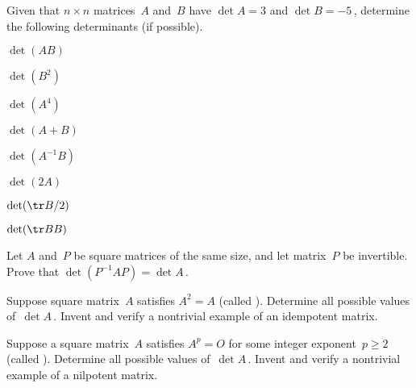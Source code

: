\begin{exercise}  
Given that \(n\times n\) matrices~\(A\) and~\(B\) have \(\det A=3\) and \(\det B=-5\)\,, determine the following determinants (if possible).
\begin{Parts}
\item \(\det(AB)\)

\item \(\det(B^2)\)

\item \(\det(A^4)\)

\item \(\det(A+B)\)

\item \(\det(A^{-1}B)\)

\item \(\det(2A)\)

\begin{OmitV1}
\item \(\det(\tr B/2)\)

\item \(\det(\tr BB)\)
\end{OmitV1}

\end{Parts}
\end{exercise}






\begin{exercise}  
Let \(A\) and~\(P\) be square matrices of the same size, and let matrix~\(P\) be invertible.  Prove that \(\det(P^{-1}AP)=\det A\)\,.
\end{exercise}





\begin{exercise}  
Suppose square matrix~\(A\) satisfies \(A^2=A\) (called ).  Determine all possible values of~\(\det A\)\,.
Invent and verify a nontrivial example of an idempotent matrix.
\end{exercise}



\begin{exercise}  
Suppose a square matrix~\(A\) satisfies \(A^p=O\) for some integer exponent~\(p\geq 2\) (called ). 
Determine all possible values of~\(\det A\)\,.
Invent and verify a nontrivial example of a nilpotent matrix. 
\end{exercise}






